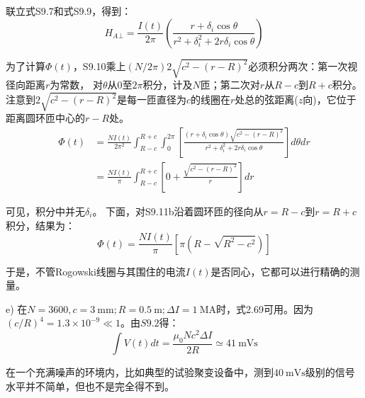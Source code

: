 联立式S9.7和式S9.9，得到：
\begin{equation*}
H_{A\bot}=\frac{I(t)}{2\pi}\left(\frac{r+\delta_i \cos\theta}{r^2+\delta_i^2+2r\delta_i\cos\theta}\right) \tag{S9.10}
\end{equation*}

为了计算$\Phi(t)$，S9.10乘上$(N/2\pi)2\sqrt{c^2−(r−R)^2}$必须积分两次：第一次视径向距离$r$为常数，
对$\theta$从$0$至$2\pi$积分，计及$N$匝；第二次对$r$从$R-c$到$R+c$积分。
注意到$2\sqrt{c^2−(r−R)^2}$是每一匝直径为$c$的线圈在$r$处总的弦距离($z$向)，它位于距离圆环匝中心的$r-R$处。
\begin{align}
\Phi(t)&=\frac{N I(t)}{2\pi^2}\int_{R-c}^{R+c}\int_{0}^{2\pi}\left[ \frac{(r+\delta_i \cos\theta)\sqrt{c^2-(r-R)^2}}{r^2+\delta_i^2+2r\delta_i \cos\theta}\right]d\theta dr\nonumber\tag{S9.11a}\\
&=\frac{N I(t)}{\pi}\int_{R-c}^{R+c} \left[ 0+\frac{\sqrt{c^2-(r-R)^2}}{r}\right]dr\nonumber\tag{S9.11b}
\end{align}

可见，积分中并无$\delta_i$。
下面，对S9.11b沿着圆环匝的径向从$r=R-c$到$r=R+c$积分，结果为：
\begin{equation*}
\Phi(t)=\frac{N I(t)}{\pi}\left[ \pi(R-\sqrt{R^2-c^2})\right] \tag{S9.11c}
\end{equation*}

于是，不管Rogowski线圈与其围住的电流$I(t)$是否同心，它都可以进行精确的测量。

e) 在$N = 3600, c = 3\ \mathrm{mm}; R = 0.5\ \mathrm{m}; \Delta I = 1\ \mathrm{MA}$时，式2.69可用。因为$(c/R)^4 = 1.3×10^{−9}\ll 1$。由$S9.2$得：
$$\int V(t)dt=\frac{\mu_0 N c^2 \Delta I}{2R}\simeq 41\ \mathrm{mVs}$$

在一个充满噪声的环境内，比如典型的试验聚变设备中，测到$40\ \mathrm{mVs}$级别的信号水平并不简单，但也不是完全得不到。

